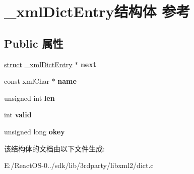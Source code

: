 \hypertarget{struct__xml_dict_entry}{}\section{\+\_\+xml\+Dict\+Entry结构体 参考}
\label{struct__xml_dict_entry}
\subsection*{Public 属性}
\begin{DoxyCompactItemize}
\item 
\mbox{\label{struct__xml_dict_entry_ad38b441739752654c61d2cd0faff225d}} 
\hyperlink{interfacestruct}{struct} \hyperlink{struct__xml_dict_entry}{\+\_\+xml\+Dict\+Entry} $\ast$ {\bfseries next}
\item 
\mbox{\label{struct__xml_dict_entry_a2b9048b75611eab3643df4c9a5980e72}} 
const xml\+Char $\ast$ {\bfseries name}
\item 
\mbox{\label{struct__xml_dict_entry_a5f01f11fda6dd2374bc1ad6210039457}} 
unsigned int {\bfseries len}
\item 
\mbox{\label{struct__xml_dict_entry_a96fff968e297391cfa6808273e0c6d25}} 
int {\bfseries valid}
\item 
\mbox{\label{struct__xml_dict_entry_ae0e2514a84732810924c18c8504da682}} 
unsigned long {\bfseries okey}
\end{DoxyCompactItemize}


该结构体的文档由以下文件生成\+:\begin{DoxyCompactItemize}
\item 
E\+:/\+React\+O\+S-\/0../sdk/lib/3rdparty/libxml2/dict.\+c\end{DoxyCompactItemize}
